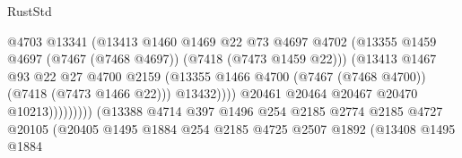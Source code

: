 \begin{lexlean}{RustStd}
\begin{coremodule}
                                                @4703
                                                @13341
                                                (@13413
                                                  @1460
                                                  @1469
                                                  @22
                                                  @73
                                                  @4697
                                                  @4702
                                                  (@13355
                                                    @1459
                                                    @4697
                                                    (@7467 (@7468 @4697))
                                                    (@7418 (@7473 @1459 @22)))
                                                  (@13413
                                                    @1467
                                                    @93
                                                    @22
                                                    @27
                                                    @4700
                                                    @2159
                                                    (@13355
                                                      @1466
                                                      @4700
                                                      (@7467 (@7468 @4700))
                                                      (@7418 (@7473 @1466 @22)))
                                                    @13432))))
                                            @20461
                                            @20464
                                            @20467
                                            @20470
                                            @10213)))))))))
                          (@13388
                            @4714
                            @397
                            @1496
                            @254
                            @2185
                            @2774
                            @2185
                            @4727
                            @20105
                            (@20405
                              @1495
                              @1884
                              @254
                              @2185
                              @4725
                              @2507
                              @1892
                              (@13408
                                @1495
                                @1884

\end{coremodule}
\end{lexlean}
